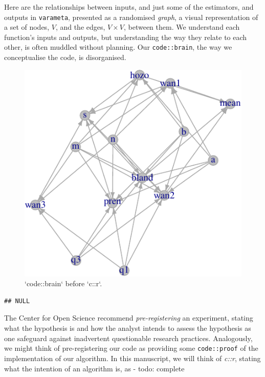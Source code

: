\documentclass[
]{article}
\begin{document}
Here are the relationships between inputs, and just some of the estimators, and outputs in \texttt{varameta}, presented as a randomised \emph{graph}, a visual representation of a set of nodes, \(V\), and the edges, \(V \times V\), between them. We understand each function's inputs and outputs, but understanding the way they relate to each other, is often muddled without planning. Our \texttt{code::brain}, the way we conceptualise the code, is disorganised.

\begin{figure}

{\centering \includegraphics{when-is-done-done_files/figure-latex/codebrain-1} 

}

\caption{`code::brain` before `c::r`.}\label{fig:codebrain}
\end{figure}

\begin{verbatim}
## NULL
\end{verbatim}

The Center for Open Science recommend \emph{pre-registering} an experiment, stating what the hypothesis is and how the analyst intends to assess the hypothesis as one safeguard against inadvertent questionable research practices. Analogously, we might think of pre-registering our code as providing some \texttt{code::proof} of the implementation of our algorithm. In this manuscript, we will think of \emph{c::r}, stating what the intention of an algorithm is, as - todo: complete
\end{document}
